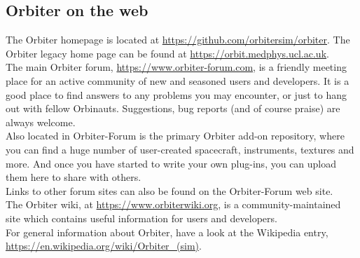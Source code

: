 \documentclass[Orbiter User Manual.tex]{subfiles}
\begin{document}
\subsection{Orbiter on the web}
The Orbiter homepage is located at \url{https://github.com/orbitersim/orbiter}. The Orbiter legacy home page can be found at \url{https://orbit.medphys.ucl.ac.uk}.\\
The main Orbiter forum, \url{https://www.orbiter-forum.com}, is a friendly meeting place for an active community of new and seasoned users and developers. It is a good place to find answers to any problems you may encounter, or just to hang out with fellow Orbinauts. Suggestions, bug reports (and of course praise) are always welcome.\\
Also located in Orbiter-Forum is the primary Orbiter add-on repository, where you can find a huge number of user-created spacecraft, instruments, textures and more. And once you have started to write your own plug-ins, you can upload them here to share with others.\\
Links to other forum sites can also be found on the Orbiter-Forum web site.\\
The Orbiter wiki, at \url{https://www.orbiterwiki.org}, is a community-maintained site which contains useful information for users and developers.\\
For general information about Orbiter, have a look at the Wikipedia entry, \url{https://en.wikipedia.org/wiki/Orbiter_(sim)}.
\end{document}
